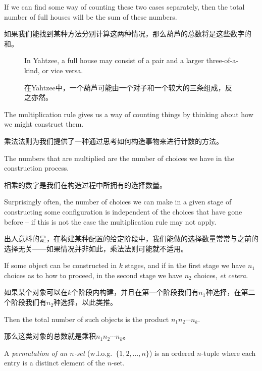 If we can find some way of counting these
two cases separately, then the total number of full houses will be the 
sum of these numbers.

如果我们能找到某种方法分别计算这两种情况，那么葫芦的总数将是这些数字的和。

\begin{figure}[!hbtp]
\begin{center}


\vspace{.3in}


\end{center}
\caption[Full houses in Yahtzee.]{In Yahtzee, a full house may consist of 
a pair and a larger three-of-a-kind, or vice versa.}
\caption[Yahtzee中的葫芦。]{在Yahtzee中，一个葫芦可能由一个对子和一个较大的三条组成，反之亦然。}
\label{fig:full_house} 
\end{figure}


The multiplication rule gives 
us a way of counting things by thinking
about how we might construct them.

乘法法则为我们提供了一种通过思考如何构造事物来进行计数的方法。

The numbers that are multiplied
are the number of choices we have in the construction process.

相乘的数字是我们在构造过程中所拥有的选择数量。

Surprisingly often, the number of choices we can make in a given 
stage of constructing some configuration is independent of the choices
that have gone before -- if this is not the case the multiplication rule
may not apply.

出人意料的是，在构建某种配置的给定阶段中，我们能做的选择数量常常与之前的选择无关——如果情况并非如此，乘法法则可能就不适用。

If some object can be constructed in $k$ stages, and if in the first
stage we have $n_1$ choices as to how to proceed, in the second stage
we have $n_2$ choices, \emph{et cetera}.

如果某个对象可以在$k$个阶段内构建，并且在第一个阶段我们有$n_1$种选择，在第二个阶段我们有$n_2$种选择，以此类推。

Then the total number of such
objects is the product $n_1n_2 \cdots n_k$.

那么这类对象的总数就是乘积$n_1n_2 \cdots n_k$。

A \emph{permutation of an $n$-set} (w.l.o.g.\ $\{1,2,\ldots , n\}$) is an ordered $n$-tuple where each entry is a distinct element of the
$n$-set.

